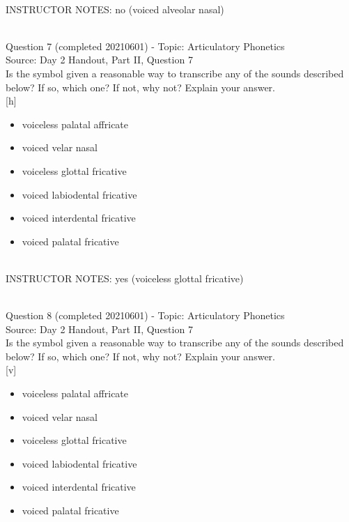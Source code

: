 \documentclass[12pt]{article}
\begin{document}
~\\
INSTRUCTOR NOTES: no (voiced alveolar nasal)


~\\

{\large Question 7} (completed 20210601) - Topic: Articulatory Phonetics\\
Source: Day 2 Handout, Part II, Question 7\\

Is the symbol given a reasonable way to transcribe any of the sounds described below? If so, which one? If not, why not? Explain your answer.\\

{[h]}

\begin{itemize} \item voiceless palatal affricate \item voiced velar nasal \item voiceless glottal fricative \item voiced labiodental fricative \item voiced interdental fricative \item voiced palatal fricative \end{itemize}


~\\
INSTRUCTOR NOTES: yes (voiceless glottal fricative)


~\\

{\large Question 8} (completed 20210601) - Topic: Articulatory Phonetics\\
Source: Day 2 Handout, Part II, Question 7\\

Is the symbol given a reasonable way to transcribe any of the sounds described below? If so, which one? If not, why not? Explain your answer.\\

{[v]}

\begin{itemize} \item voiceless palatal affricate \item voiced velar nasal \item voiceless glottal fricative \item voiced labiodental fricative \item voiced interdental fricative \item voiced palatal fricative \end{itemize}
\end{document}
